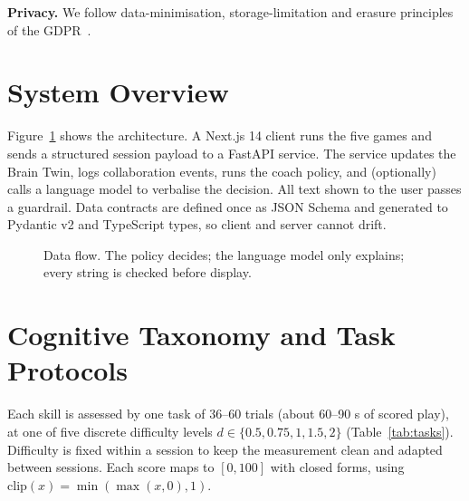 \documentclass[conference]{IEEEtran}
\begin{document}
\textbf{Privacy.} We follow data-minimisation, storage-limitation and erasure principles of the GDPR~\cite{gdpr}.

\section{System Overview}
Figure~\ref{fig:arch} shows the architecture. A Next.js 14 client runs the five games and sends a structured session payload to a FastAPI service. The service updates the Brain Twin, logs collaboration events, runs the coach policy, and (optionally) calls a language model to verbalise the decision. All text shown to the user passes a guardrail. Data contracts are defined once as JSON Schema and generated to Pydantic v2 and TypeScript types, so client and server cannot drift.

\begin{figure}[t]
\centering
{}
\caption{Data flow. The policy decides; the language model only explains; every string is checked before display.}
\label{fig:arch}
\end{figure}

\section{Cognitive Taxonomy and Task Protocols}\label{sec:tasks}
Each skill is assessed by one task of 36--60 trials (about 60--90 s of scored play), at one of five discrete difficulty levels $d\in\{0.5,0.75,1,1.5,2\}$ (Table~\ref{tab:tasks}). Difficulty is fixed within a session to keep the measurement clean and adapted between sessions. Each score maps to $[0,100]$ with closed forms, using $\mathrm{clip}(x)=\min(\max(x,0),1)$.
\end{document}
